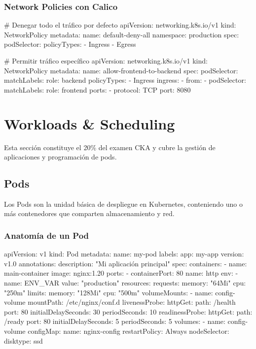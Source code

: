 \documentclass[11pt,a4paper]{article}
\begin{document}
\subsubsection{Network Policies con Calico}

\begin{commandbox}
\# Denegar todo el tráfico por defecto
apiVersion: networking.k8s.io/v1
kind: NetworkPolicy
metadata:
  name: default-deny-all
  namespace: production
spec:
  podSelector: {}
  policyTypes:
  - Ingress
  - Egress

\# Permitir tráfico específico
apiVersion: networking.k8s.io/v1
kind: NetworkPolicy
metadata:
  name: allow-frontend-to-backend
spec:
  podSelector:
    matchLabels:
      role: backend
  policyTypes:
  - Ingress
  ingress:
  - from:
    - podSelector:
        matchLabels:
          role: frontend
    ports:
    - protocol: TCP
      port: 8080
\end{commandbox}

\newpage

\section{Workloads \& Scheduling}

\begin{warningbox}
Esta sección constituye el 20\% del examen CKA y cubre la gestión de aplicaciones y programación de pods.
\end{warningbox}

\subsection{Pods}

Los Pods son la unidad básica de despliegue en Kubernetes, conteniendo uno o más contenedores que comparten almacenamiento y red.

\subsubsection{Anatomía de un Pod}

\begin{commandbox}
apiVersion: v1
kind: Pod
metadata:
  name: my-pod
  labels:
    app: my-app
    version: v1.0
  annotations:
    description: "Mi aplicación principal"
spec:
  containers:
  - name: main-container
    image: nginx:1.20
    ports:
    - containerPort: 80
      name: http
    env:
    - name: ENV_VAR
      value: "production"
    resources:
      requests:
        memory: "64Mi"
        cpu: "250m"
      limits:
        memory: "128Mi"
        cpu: "500m"
    volumeMounts:
    - name: config-volume
      mountPath: /etc/nginx/conf.d
    livenessProbe:
      httpGet:
        path: /health
        port: 80
      initialDelaySeconds: 30
      periodSeconds: 10
    readinessProbe:
      httpGet:
        path: /ready
        port: 80
      initialDelaySeconds: 5
      periodSeconds: 5
  volumes:
  - name: config-volume
    configMap:
      name: nginx-config
  restartPolicy: Always
  nodeSelector:
    disktype: ssd
\end{commandbox}
\end{document}
